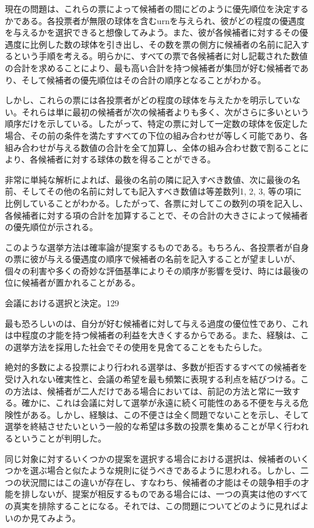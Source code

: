 \documentclass[a4paper,11pt,openany]{ltjsbook}
\begin{document}
現在の問題は、これらの票によって候補者の間にどのように優先順位を決定するかである。各投票者が無限の球体を含むurnを与えられ、彼がどの程度の優遇度を与えるかを選択できると想像してみよう。また、彼が各候補者に対するその優遇度に比例した数の球体を引き出し、その数を票の側方に候補者の名前に記入するという手順を考える。明らかに、すべての票で各候補者に対し記載された数値の合計を求めることにより、最も高い合計を持つ候補者が集団が好む候補者であり、そして候補者の優先順位はその合計の順序となることがわかる。

しかし、これらの票には各投票者がどの程度の球体を与えたかを明示していない。それらは単に最初の候補者が次の候補者よりも多く、次がさらに多いという順序だけを示している。したがって、特定の票に対して一定数の球体を仮定した場合、その前の条件を満たすすべての下位の組み合わせが等しく可能であり、各組み合わせが与える数値の合計を全て加算し、全体の組み合わせ数で割ることにより、各候補者に対する球体の数を得ることができる。

非常に単純な解析によれば、最後の名前の隣に記入すべき数値、次に最後の名前、そしてその他の名前に対しても記入すべき数値は等差数列1, 2, 3, 等の項に比例していることがわかる。したがって、各票に対してこの数列の項を記入し、各候補者に対する項の合計を加算することで、その合計の大きさによって候補者の優先順位が示される。

このような選挙方法は確率論が提案するものである。もちろん、各投票者が自身の票に彼が与える優遇度の順序で候補者の名前を記入することが望ましいが、個々の利害や多くの奇妙な評価基準によりその順序が影響を受け、時には最後の位に候補者が置かれることがある。

会議における選択と決定。129

最も恐ろしいのは、自分が好む候補者に対して与える過度の優位性であり、これは中程度の才能を持つ候補者の利益を大きくするからである。また、経験は、この選挙方法を採用した社会でその使用を見舍てることをもたらした。

絶対的多数による投票により行われる選挙は、多数が拒否するすべての候補者を受け入れない確実性と、会議の希望を最も頻繁に表現する利点を結びつける。この方法は、候補者が二人だけである場合においては、前記の方法と常に一致する。確かに、これは会議に対して選挙が永遠に続く可能性のある不便を与える危険性がある。しかし、経験は、この不便さは全く問題でないことを示し、そして選挙を終結させたいという一般的な希望は多数の投票を集めることが早く行われるということが判明した。

同じ対象に対するいくつかの提案を選択する場合における選択は、候補者のいくつかを選ぶ場合と似たような規則に従うべきであるように思われる。しかし、二つの状況間にはこの違いが存在し、すなわち、候補者の才能はその競争相手の才能を排しないが、提案が相反するものである場合には、一つの真実は他のすべての真実を排除することになる。それでは、この問題についてどのように見ればよいのか見てみよう。
\end{document}
